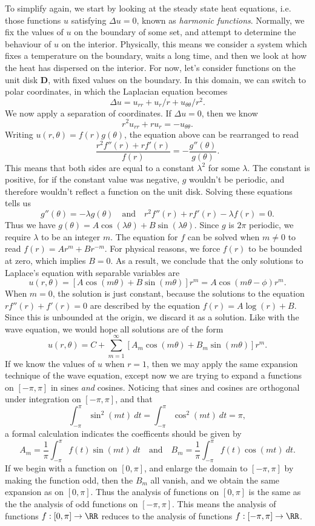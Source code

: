 To simplify again, we start by looking at the steady state heat equations, i.e. those functions $u$ satisfying $\Delta u = 0$, known as \emph{harmonic functions}. Normally, we fix the values of $u$ on the boundary of some set, and attempt to determine the behaviour of $u$ on the interior. Physically, this means we consider a system which fixes a temperature on the boundary, waits a long time, and then we look at how the heat has dispersed on the interior. For now, let's consider functions on the unit disk $\mathbf{D}$, with fixed values on the boundary. In this domain, we can switch to polar coordinates, in which the Laplacian equation becomes
%
\[ \Delta u = u_{rr} + u_r/r + u_{\theta \theta}/r^2. \]
%
We now apply a separation of coordinates. If $\Delta u = 0$, then we know
%
\[ r^2 u_{rr} + r u_r = - u_{\theta \theta}. \]
%
Writing $u(r,\theta) = f(r)g(\theta)$, the equation above  can be rearranged to read
%
\[ \frac{r^2 f''(r) + r f'(r)}{f(r)} = - \frac{g''(\theta)}{g(\theta)}. \]
%
This means that both sides are equal to a constant $\lambda^2$ for some $\lambda$. The constant is positive, for if the constant value was negative, $g$ wouldn't be periodic, and therefore wouldn't reflect a function on the unit disk. Solving these equations tells us
%
\[ g''(\theta) = -\lambda g(\theta)\quad\text{and}\quad r^2 f''(r) + rf'(r) - \lambda f(r) = 0. \]
%
Thus we have $g(\theta) = A \cos(\lambda \theta) + B \sin(\lambda \theta)$. Since $g$ is $2\pi$ periodic, we require $\lambda$ to be an integer $m$. The equation for $f$ can be solved when $m \neq 0$ to read $f(r) = A r^m + B r^{-m}$. For physical reasons, we force $f(r)$ to be bounded at zero, which implies $B = 0$. As a result, we conclude that the only solutions to Laplace's equation with separable variables are
%
\[ u(r,\theta) = [A \cos(m \theta) + B \sin(m \theta)] r^m = A \cos(m \theta - \phi) r^m. \]
%
When $m = 0$, the solution is just constant, because the solutions to the equation $r f''(r) + f'(r) = 0$ are described by the equation $f(r) = A \log(r) + B$. Since this is unbounded at the origin, we discard it as a solution. Like with the wave equation, we would hope all solutions are of the form
%
\[ u(r,\theta) = C + \sum_{m = 1}^\infty [A_m \cos(m \theta) + B_m \sin(m \theta)] r^m. \]
%
If we know the values of $u$ when $r = 1$, then we may apply the same expansion technique of the wave equation, except now we are trying to expand a functions on $[-\pi,\pi]$ in sines {\it and} cosines. Noticing that sines and cosines are orthogonal under integration on $[-\pi,\pi]$, and that
%
\[ \int_{-\pi}^\pi \sin^2(mt)\ dt = \int_{-\pi}^\pi \cos^2(mt)\ dt = \pi, \]
%
a formal calculation indicates the coefficents should be given by
%
\[ A_m = \frac{1}{\pi} \int_{-\pi}^\pi f(t) \sin(mt)\ dt \quad\text{and}\quad B_m = \frac{1}{\pi} \int_{-\pi}^\pi f(t) \cos(mt)\ dt. \]
%
If we begin with a function on $[0,\pi]$, and enlarge the domain to $[-\pi,\pi]$ by making the function odd, then the $B_m$ all vanish, and we obtain the same expansion as on $[0,\pi]$. Thus the analysis of functions on $[0,\pi]$ is the same as the the analysis of odd functions on $[-\pi,\pi]$. This means the analysis of functions $f: [0,\pi] \to \RR$ reduces to the analysis of functions $f: [-\pi,\pi] \to \RR$.

